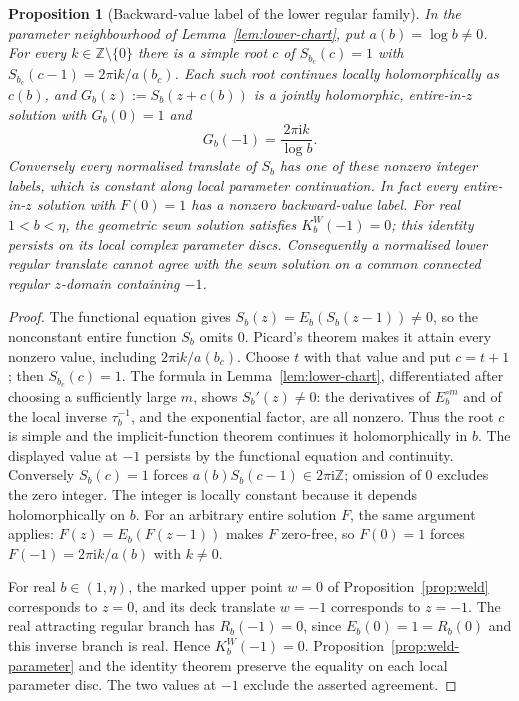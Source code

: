 \documentclass[11pt]{amsart}
\newtheorem{proposition}[theorem]{Proposition}
\theoremstyle{definition}
\newcommand{\Rr}{R}
\newcommand{\Kk}{K}
\newcommand{\ii}{\mathrm{i}}
\begin{document}
\begin{proposition}[Backward-value label of the lower regular family]
\label{prop:lower-backward-label}
In the parameter neighbourhood of Lemma~\ref{lem:lower-chart}, put
$a(b)=\log b\ne0$.  For every $k\in\mathbb Z\setminus\{0\}$ there is a
simple root $c$ of $S_{b_c}(c)=1$ with
$S_{b_c}(c-1)=2\pi\ii k/a(b_c)$.  Each such root continues locally
holomorphically as $c(b)$, and
$G_b(z):=S_b(z+c(b))$ is a jointly holomorphic, entire-in-$z$
solution with $G_b(0)=1$ and
\[
 G_b(-1)=\frac{2\pi\ii k}{\log b}.
\]
Conversely every normalised translate of $S_b$ has one of these nonzero
integer labels, which is constant along local parameter continuation.
In fact every entire-in-$z$ solution with $F(0)=1$ has a nonzero
backward-value label.
For real $1<b<\eta$, the geometric sewn solution satisfies
$\Kk_b^W(-1)=0$; this identity persists on its local complex parameter
discs.  Consequently a normalised lower regular translate cannot
agree with the sewn solution on a common connected regular $z$-domain
containing $-1$.
\end{proposition}

\begin{proof}
The functional equation gives $S_b(z)=E_b(S_b(z-1))\ne0$, so the
nonconstant entire function $S_b$ omits $0$.  Picard's theorem makes
it attain every nonzero value, including $2\pi\ii k/a(b_c)$.
Choose $t$ with that value and put $c=t+1$; then $S_{b_c}(c)=1$.
The formula in Lemma~\ref{lem:lower-chart}, differentiated after
choosing a sufficiently large $m$, shows $S_b'(z)\ne0$: the derivatives
of $E_b^{\circ m}$ and of the local inverse $\tau_b^{-1}$, and the
exponential factor, are all nonzero.  Thus the root $c$ is simple and
the implicit-function theorem continues it holomorphically in $b$.
The displayed value at $-1$ persists by the functional equation and
continuity.  Conversely $S_b(c)=1$ forces
$a(b)S_b(c-1)\in2\pi\ii\mathbb Z$; omission of $0$ excludes the zero
integer.  The integer is locally constant because it depends
holomorphically on $b$.
For an arbitrary entire solution $F$, the same argument applies:
$F(z)=E_b(F(z-1))$ makes $F$ zero-free, so $F(0)=1$ forces
$F(-1)=2\pi\ii k/a(b)$ with $k\ne0$.

For real $b\in(1,\eta)$, the marked upper point $w=0$ of
Proposition~\ref{prop:weld} corresponds to $z=0$, and its deck translate
$w=-1$ corresponds to $z=-1$.  The real attracting regular branch has
$\Rr_b(-1)=0$, since $E_b(0)=1=\Rr_b(0)$ and this inverse branch is real.
Hence $\Kk_b^W(-1)=0$.  Proposition~\ref{prop:weld-parameter} and the
identity theorem preserve the equality on each local parameter disc.
The two values at $-1$ exclude the asserted agreement.
\end{proof}
\end{document}
